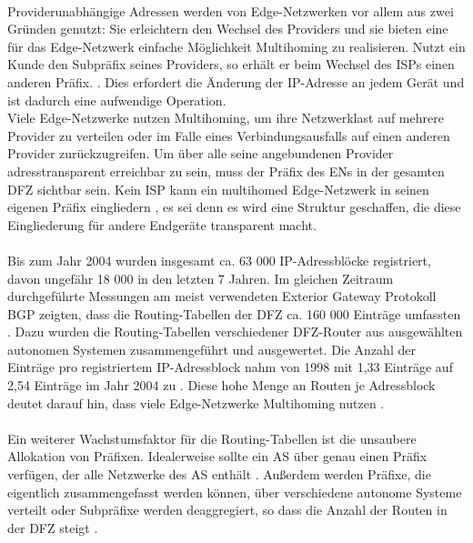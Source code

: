 \paragraph{}
Providerunabhängige Adressen werden von Edge-Netzwerken vor allem aus zwei Gründen genutzt: Sie erleichtern den Wechsel des Providers und sie bieten eine für das Edge-Netzwerk einfache Möglichkeit Multihoming zu realisieren. Nutzt ein Kunde den Subpräfix seines Providers, so erhält er beim Wechsel des ISPs einen anderen Präfix. \cite{jen:2008:start}. Dies erfordert die Änderung der IP-Adresse an jedem Gerät und ist dadurch eine aufwendige Operation. \\
Viele Edge-Netzwerke nutzen Multihoming, um ihre Netzwerklast auf mehrere Provider zu verteilen oder im Falle eines Verbindungsausfalls auf einen anderen Provider zurückzugreifen. Um über alle seine angebundenen Provider adresstransparent erreichbar zu sein, muss der Präfix des ENs in der gesamten DFZ sichtbar sein. Kein ISP kann ein multihomed Edge-Netzwerk in seinen eigenen Präfix eingliedern \cite{jen:2008:start}, es sei denn es wird eine Struktur geschaffen, die diese Eingliederung für andere Endgeräte transparent macht.

\paragraph{}
Bis zum Jahr 2004 wurden insgesamt ca. 63 000 IP-Adressblöcke registriert, davon ungefähr 18 000 in den letzten 7 Jahren. Im gleichen Zeitraum durchgeführte Messungen am meist verwendeten Exterior Gateway Protokoll BGP zeigten, dass die Routing-Tabellen der DFZ ca. 160 000 Einträge umfassten \cite{journals/ccr/MengXZHLZ04}. Dazu wurden die Routing-Tabellen verschiedener DFZ-Router aus ausgewählten autonomen Systemen zusammengeführt und ausgewertet. Die Anzahl der Einträge pro registriertem IP-Adressblock nahm von 1998 mit 1,33 Einträge auf 2,54 Einträge im Jahr 2004 zu \cite{journals/ccr/MengXZHLZ04}. Diese hohe Menge an Routen je Adressblock deutet darauf hin, dass viele Edge-Netzwerke Multihoming nutzen \cite{huston:2001:analyzing}.

\paragraph{}
Ein weiterer Wachstumsfaktor für die Routing-Tabellen ist die unsaubere Allokation von Präfixen. Idealerweise sollte ein AS über genau einen Präfix verfügen, der alle Netzwerke des AS enthält \cite{hawkinson:1996:autnomousSystems}. Außerdem werden Präfixe, die eigentlich zusammengefasst werden können, über verschiedene autonome Systeme verteilt oder Subpräfixe werden deaggregiert, so dass die Anzahl der Routen in der DFZ steigt \cite{journals/ccr/MengXZHLZ04}. \\

